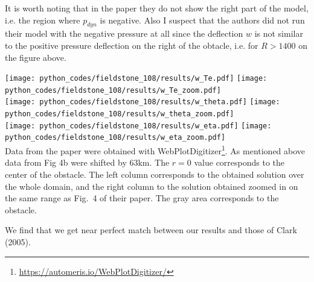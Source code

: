 It is worth noting that in the paper they do not show the right part of the model, i.e. the region 
where $p_{dyn}$ is negative. Also I suspect that the authors did not run their model with 
the negative pressure at all since the deflection $w$ is not similar to the positive pressure 
deflection on the right of the obtacle, i.e. for $R>1400$ on the figure above.

\newpage
\begin{center}
\texttt{[image: python\_codes/fieldstone\_108/results/w\_Te.pdf]}
\texttt{[image: python\_codes/fieldstone\_108/results/w\_Te\_zoom.pdf]}\\
\texttt{[image: python\_codes/fieldstone\_108/results/w\_theta.pdf]}
\texttt{[image: python\_codes/fieldstone\_108/results/w\_theta\_zoom.pdf]}\\
\texttt{[image: python\_codes/fieldstone\_108/results/w\_eta.pdf]}
\texttt{[image: python\_codes/fieldstone\_108/results/w\_eta\_zoom.pdf]}\\
{\captionfont Data from the paper were obtained with WebPlotDigitizer\footnote{\url{https://automeris.io/WebPlotDigitizer/}}. 
As mentioned above data from Fig 4b were shifted by 63km. The $r=0$ value corresponds to the center of the obstacle. The left 
column corresponds to the obtained solution over the whole domain, and the right column to the solution obtained zoomed in 
on the same range as Fig.~4 of their paper. The gray area corresponds to the obstacle.}
\end{center}

We find that we get near perfect match between our results and those of Clark \etal (2005). 



